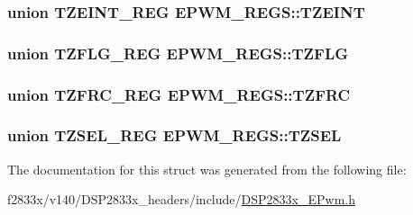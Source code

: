 \subsubsection[{T\+Z\+E\+I\+N\+T}]{\setlength{\rightskip}{0pt plus 5cm}union {\bf T\+Z\+E\+I\+N\+T\+\_\+\+R\+E\+G} E\+P\+W\+M\+\_\+\+R\+E\+G\+S\+::\+T\+Z\+E\+I\+N\+T}\label{struct_e_p_w_m___r_e_g_s_a39cd5641cbb06b92e9647dadfdc60024}
\hypertarget{struct_e_p_w_m___r_e_g_s_af209cbb6b99dbb580cf0fc8787bd18b9}{}
\subsubsection[{T\+Z\+F\+L\+G}]{\setlength{\rightskip}{0pt plus 5cm}union {\bf T\+Z\+F\+L\+G\+\_\+\+R\+E\+G} E\+P\+W\+M\+\_\+\+R\+E\+G\+S\+::\+T\+Z\+F\+L\+G}\label{struct_e_p_w_m___r_e_g_s_af209cbb6b99dbb580cf0fc8787bd18b9}
\hypertarget{struct_e_p_w_m___r_e_g_s_accc1f186ccb71886f5d84c69c7421b35}{}
\subsubsection[{T\+Z\+F\+R\+C}]{\setlength{\rightskip}{0pt plus 5cm}union {\bf T\+Z\+F\+R\+C\+\_\+\+R\+E\+G} E\+P\+W\+M\+\_\+\+R\+E\+G\+S\+::\+T\+Z\+F\+R\+C}\label{struct_e_p_w_m___r_e_g_s_accc1f186ccb71886f5d84c69c7421b35}
\hypertarget{struct_e_p_w_m___r_e_g_s_a8cef159efb9754bf2471b656af814161}{}
\subsubsection[{T\+Z\+S\+E\+L}]{\setlength{\rightskip}{0pt plus 5cm}union {\bf T\+Z\+S\+E\+L\+\_\+\+R\+E\+G} E\+P\+W\+M\+\_\+\+R\+E\+G\+S\+::\+T\+Z\+S\+E\+L}\label{struct_e_p_w_m___r_e_g_s_a8cef159efb9754bf2471b656af814161}


The documentation for this struct was generated from the following file\+:\begin{DoxyCompactItemize}
\item 
f2833x/v140/\+D\+S\+P2833x\+\_\+headers/include/\hyperlink{_d_s_p2833x___e_pwm_8h}{D\+S\+P2833x\+\_\+\+E\+Pwm.\+h}\end{DoxyCompactItemize}
